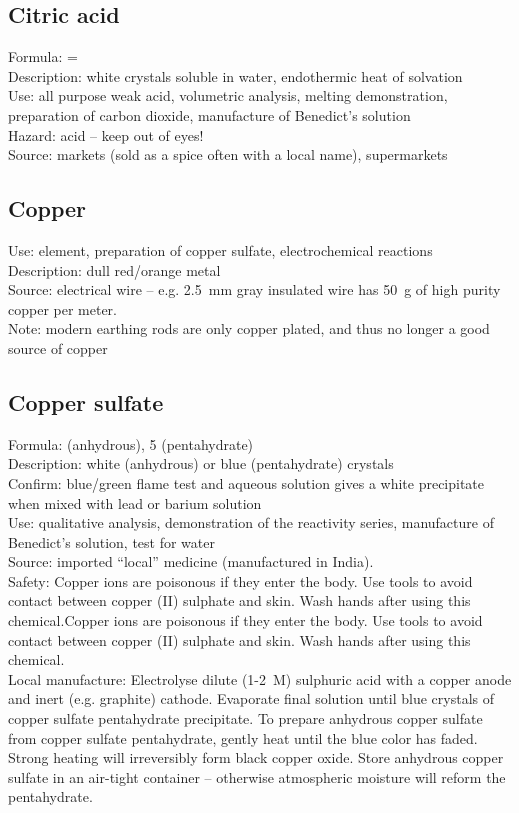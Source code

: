 \subsection*{Citric acid}
Formula:  = \\
Description: white crystals soluble in water, 
endothermic heat of solvation\\
Use: all purpose weak acid, 
volumetric analysis, 
melting demonstration, 
preparation of carbon dioxide, 
manufacture of Benedict's solution\\
Hazard: acid – keep out of eyes!\\
Source: markets (sold as a spice often with a local name), 
supermarkets
\subsection*{Copper}
\label{sec:copper}
Use: element, 
preparation of copper sulfate, 
electrochemical reactions\\
Description: dull red/orange metal\\
Source: electrical wire -- e.g. 
2.5~mm gray insulated wire has 50~g of high purity copper per meter.\\
Note: modern earthing rods are only copper plated, 
and thus no longer a good source of copper
\subsection*{Copper sulfate}
Formula:  (anhydrous), 
 5 (pentahydrate)\\
Description: white (anhydrous) or blue (pentahydrate) crystals\\
Confirm: blue/green flame test 
and aqueous solution gives a white precipitate 
when mixed with lead or barium solution\\
Use: qualitative analysis, 
demonstration of the reactivity series, 
manufacture of Benedict's solution, 
test for water\\
Source: imported ``local'' medicine (manufactured in India).\\
Safety: Copper ions are poisonous if they enter the body. Use tools to avoid contact between copper (II) sulphate and skin. Wash hands after using this chemical.Copper ions are poisonous if they enter the body. Use tools to avoid contact between copper (II) sulphate and skin. Wash hands after using this chemical.\\ 
Local manufacture: Electrolyse dilute (1-2~M) sulphuric acid 
with a copper anode and inert (e.g. 
graphite) cathode. 
Evaporate final solution until 
blue crystals of copper sulfate pentahydrate precipitate. 
To prepare anhydrous copper sulfate from copper sulfate pentahydrate, 
gently heat until the blue color has faded. 
Strong heating will irreversibly form black copper oxide. 
Store anhydrous copper sulfate in an air-tight container -- 
otherwise atmospheric moisture will reform the pentahydrate.

